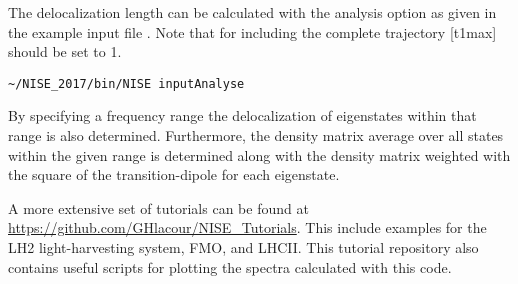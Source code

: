 The delocalization length \cite{Thouless.1974.PR.13.93} can be calculated with the analysis option as given in 
the example input file . Note that for including the complete trajectory [t1max] should be set to 1. 
\begin{lstlisting}[style=mystyle]
~/NISE_2017/bin/NISE inputAnalyse 
\end{lstlisting}
By specifying a frequency range the delocalization of eigenstates within that range is also determined. Furthermore, the density matrix average over all states within the given range is determined along with the density matrix weighted with the square of the transition-dipole for each eigenstate.

A more extensive set of tutorials can be found at \url{https://github.com/GHlacour/NISE\_Tutorials}. This include examples for the LH2 light-harvesting system, FMO, and LHCII.
This tutorial repository also contains useful scripts for plotting the spectra calculated with this code.
